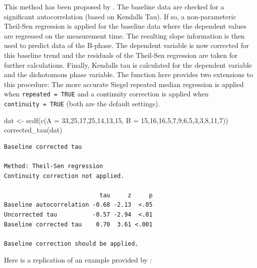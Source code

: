 \documentclass[
]{book}
\newenvironment{Shaded}{\begin{snugshade}}{\end{snugshade}}
\newcommand{\AttributeTok}[1]{\textcolor[rgb]{0.77,0.63,0.00}{#1}}
\newcommand{\DecValTok}[1]{\textcolor[rgb]{0.00,0.00,0.81}{#1}}
\newcommand{\FunctionTok}[1]{\textcolor[rgb]{0.00,0.00,0.00}{#1}}
\newcommand{\NormalTok}[1]{#1}
\newcommand{\OtherTok}[1]{\textcolor[rgb]{0.56,0.35,0.01}{#1}}
\begin{document}
This method has been proposed by \citet{tarlowImprovedRankCorrelation2016a}. The baseline data are checked for a significant autocorrelation (based on Kendalls Tau). If so, a non-parameteric Theil-Sen regression is applied for the baseline data where the dependent values are regressed on the measurement time. The resulting slope information is then used to predict data of the B-phase. The dependent variable is now corrected for this baseline trend and the residuals of the Theil-Sen regression are taken for further calculations. Finally, Kendalls tau is calculated for the dependent variable and the dichotomous phase variable. The function here provides two extensions to this procedure: The more accurate Siegel repeated median regression is applied when \texttt{repeated\ =\ TRUE} \citep{siegelRobustRegressionUsing1982} and a continuity correction is applied when \texttt{continuity\ =\ TRUE} (both are the default settings).

\begin{Shaded}
\begin{Highlighting}[]
\NormalTok{dat }\OtherTok{\textless{}{-}} \FunctionTok{scdf}\NormalTok{(}\FunctionTok{c}\NormalTok{(}\AttributeTok{A =} \DecValTok{33}\NormalTok{,}\DecValTok{25}\NormalTok{,}\DecValTok{17}\NormalTok{,}\DecValTok{25}\NormalTok{,}\DecValTok{14}\NormalTok{,}\DecValTok{13}\NormalTok{,}\DecValTok{15}\NormalTok{, }\AttributeTok{B =} \DecValTok{15}\NormalTok{,}\DecValTok{16}\NormalTok{,}\DecValTok{16}\NormalTok{,}\DecValTok{5}\NormalTok{,}\DecValTok{7}\NormalTok{,}\DecValTok{9}\NormalTok{,}\DecValTok{6}\NormalTok{,}\DecValTok{5}\NormalTok{,}\DecValTok{3}\NormalTok{,}\DecValTok{3}\NormalTok{,}\DecValTok{8}\NormalTok{,}\DecValTok{11}\NormalTok{,}\DecValTok{7}\NormalTok{))}
\FunctionTok{corrected\_tau}\NormalTok{(dat)}
\end{Highlighting}
\end{Shaded}

\begin{verbatim}
Baseline corrected tau

Method: Theil-Sen regression
Continuity correction not applied.

                           tau     z     p
Baseline autocorrelation -0.68 -2.13  <.05
Uncorrected tau          -0.57 -2.94  <.01
Baseline corrected tau    0.70  3.61 <.001

Baseline correction should be applied.
\end{verbatim}

Here is a replication of an example provided by \citet{tarlowImprovedRankCorrelation2016a} :
\end{document}
